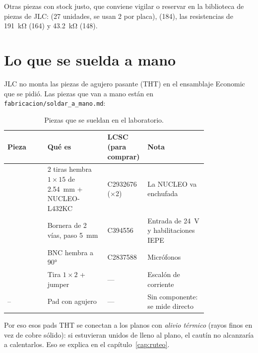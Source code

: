 Otras piezas con stock justo, que conviene vigilar o reservar en la biblioteca de piezas de JLC:  (27 unidades, se usan 2 por placa),  (184), las resistencias de \SI{191}{\kilo\ohm} (164) y \SI{43.2}{\kilo\ohm} (148).

\section{Lo que se suelda a mano}\label{sec:c05-mano}

JLC no monta las piezas de agujero pasante (THT) en el ensamblaje Economic que se pidió. Las piezas que van a mano están en \nolinkurl{fabricacion/soldar_a_mano.md}:

\begin{table}[h]
\centering
\footnotesize
\caption{Piezas que se sueldan en el laboratorio.}\label{tab:c05-mano}
\begin{tabular}{@{}lL{0.3\linewidth}L{0.2\linewidth}L{0.3\linewidth}@{}}\toprule
Pieza & Qué es & LCSC (para comprar) & Nota\\\midrule
{} & 2 tiras hembra $1\times15$ de \SI{2.54}{\milli\meter} + NUCLEO-L432KC & C2932676 ($\times$2) & La NUCLEO va enchufada\\
   & Bornera de 2 vías, paso \SI{5}{\milli\meter} & C394556 & Entrada de \SI{24}{\volt} y habilitaciones IEPE\\
  & BNC hembra a \ang{90} & C2837588 & Micrófonos\\
  & Tira $1\times2$ + jumper & — & Escalón de corriente\\
-- & Pad con agujero & — & Sin componente: se mide directo\\
\bottomrule
\end{tabular}
\end{table}

Por eso esos pads THT se conectan a los planos con \emph{alivio térmico} (rayos finos en vez de cobre sólido): si estuvieran unidos de lleno al plano, el cautín no alcanzaría a calentarlos. Eso se explica en el capítulo~\ref{cap:ruteo}.

